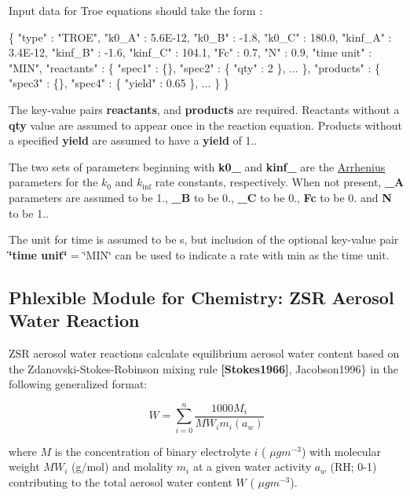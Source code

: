 Input data for Troe equations should take the form \+: 
\begin{DoxyCode}
\{
  "type" : "TROE",
  "k0\_A" : 5.6E-12,
  "k0\_B" : -1.8,
  "k0\_C" : 180.0,
  "kinf\_A" : 3.4E-12,
  "kinf\_B" : -1.6,
  "kinf\_C" : 104.1,
  "Fc"  : 0.7,
  "N"  : 0.9,
  "time unit" : "MIN",
  "reactants" : \{
    "spec1" : \{\},
    "spec2" : \{ "qty" : 2 \},
    ...
  \},
  "products" : \{
    "spec3" : \{\},
    "spec4" : \{ "yield" : 0.65 \},
    ...
  \}
\}
\end{DoxyCode}
 The key-\/value pairs {\bfseries reactants}, and {\bfseries products} are required. Reactants without a {\bfseries qty} value are assumed to appear once in the reaction equation. Products without a specified {\bfseries yield} are assumed to have a {\bfseries yield} of 1..

The two sets of parameters beginning with {\bfseries k0\+\_\+} and {\bfseries kinf\+\_\+} are the \mbox{\hyperlink{phlex_rxn_arrhenius}{Arrhenius}} parameters for the $k_0$ and $k_{\inf}$ rate constants, respectively. When not present, {\bfseries \+\_\+A} parameters are assumed to be 1., {\bfseries \+\_\+B} to be 0., {\bfseries \+\_\+C} to be 0., {\bfseries Fc} to be 0. and {\bfseries N} to be 1..

The unit for time is assumed to be s, but inclusion of the optional key-\/value pair {\bfseries \char`\"{}time unit\char`\"{}} = \char`\"{}\+M\+I\+N\char`\"{} can be used to indicate a rate with min as the time unit. \hypertarget{phlex_rxn_ZSR_aerosol_water}{}\subsection{Phlexible Module for Chemistry\+: Z\+SR Aerosol Water Reaction}\label{phlex_rxn_ZSR_aerosol_water}
Z\+SR aerosol water reactions calculate equilibrium aerosol water content based on the Zdanovski-\/\+Stokes-\/\+Robinson mixing rule {\bfseries [Stokes1966]}, Jacobson1996\} in the following generalized format\+:

\[ W = \sum\limits_{i=0}^{n}\frac{1000 M_i}{MW_i m_{i}(a_w)} \]

where $M$ is the concentration of binary electrolyte $i$ ( $\mu g m^{-3}$) with molecular weight $MW_i$ (g/mol) and molality $m_{i}$ at a given water activity $a_w$ (RH; 0-\/1) contributing to the total aerosol water content $W$ ( $\mu g m^{-3}$).

